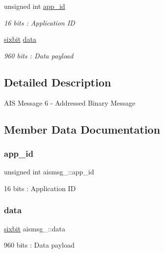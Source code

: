 \begin{DoxyCompactItemize}
unsigned int \mbox{\hyperlink{structaismsg__6_a19432e2bf3c4f9404c167f7446c5eda2}{app\+\_\+id}}
\begin{DoxyCompactList}\small\item\em 16 bits \+: Application ID \end{DoxyCompactList}\item 
\mbox{\hyperlink{structsixbit}{sixbit}} \mbox{\hyperlink{structaismsg__6_a749d7ea5722842dc7b4411d9b5318b9b}{data}}
\begin{DoxyCompactList}\small\item\em 960 bits \+: Data payload \end{DoxyCompactList}\end{DoxyCompactItemize}


\subsection{Detailed Description}
A\+IS Message 6 -\/ Addressed Binary Message 

\subsection{Member Data Documentation}
\mbox{\label{structaismsg__6_a19432e2bf3c4f9404c167f7446c5eda2}} 
\subsubsection{\texorpdfstring{app\+\_\+id}{app\_id}}
{\footnotesize\ttfamily unsigned int aismsg\+\_\+::app\+\_\+id}



16 bits \+: Application ID 

\mbox{\label{structaismsg__6_a749d7ea5722842dc7b4411d9b5318b9b}} 
\subsubsection{\texorpdfstring{data}{data}}
{\footnotesize\ttfamily \mbox{\hyperlink{structsixbit}{sixbit}} aismsg\+\_\+::data}



960 bits \+: Data payload 

